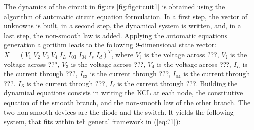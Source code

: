 \documentclass{article}
\begin{document}
The dynamics of the circuit in figure \ref{fig:figcircuit1} is obtained using the algorithm of automatic circuit equation formulation.
In a first step, the vector of unknowns is built, in a second step, the dynamical system is
written, and, in a last step, the non-smooth law is added. Applying the automatic equations generation algorithm leads to the following 9-dimensional state vector: $X=(V_1\;V_2\;V_3\;V_4\;I_L\;I_{03}\;I_{04}\;I_s\;I_d)^{T}$, where $V_{1}$ is the voltage across ???, $V_{2}$ is the voltage across ???, $V_{3}$ is the voltage across ???, $V_{4}$ is the voltage across ???, $I_{L}$ is the current through ???, $I_{03}$ is the current through ???, $I_{04}$ is the current through ???, $I_{S}$ is the current through ???, $I_{d}$ is the current through ???.  Building the dynamical equations consists in writing the KCL at each node, the constitutive equation of the smooth branch, and the
non-smooth law of the other branch. The two non-smooth devices are the diode and the switch. It yields the following system, that fits within teh general framework in (\ref{eq:71}): 
\end{document}
